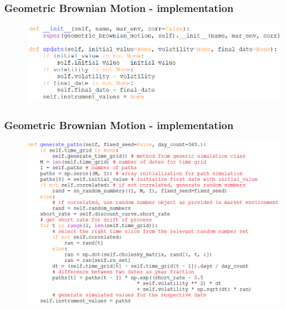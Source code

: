 \documentclass{beamer}
\begin{document}
\begin{frame}
\frametitle{Geometric Brownian Motion - implementation}
\begin{figure}[H]
	\includegraphics[scale=0.45]{gbm_init_update.png}
\end{figure}
\end{frame}

\begin{frame}
\frametitle{Geometric Brownian Motion - implementation}
\begin{figure}[H]
	\includegraphics[scale=0.47]{gbm_generate_path.png}
\end{figure}
\end{frame}
\end{document}
